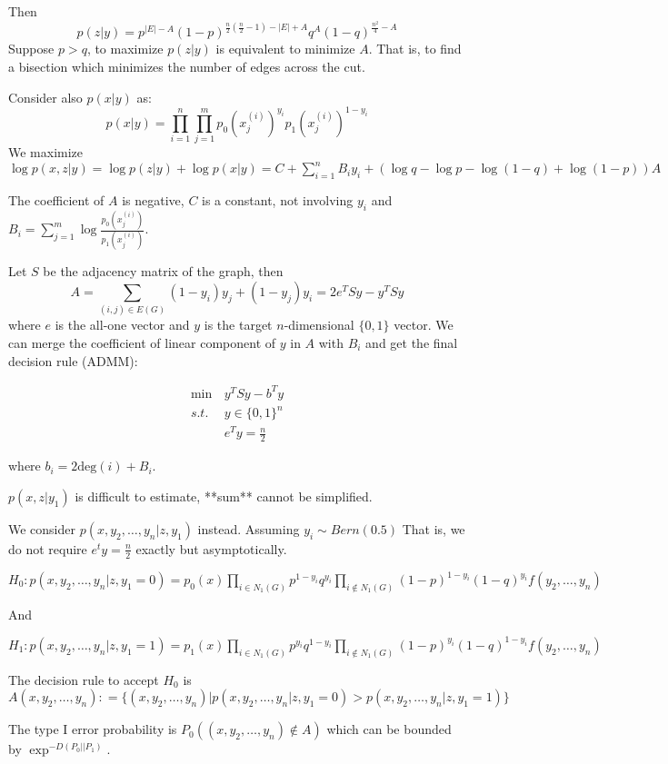 \documentclass{article}
\begin{document}
Then 
$$
p(z|y)=p^{|E|-A}(1-p)^{\frac{n}{2}(\frac{n}{2}-1)-|E|+A} q^A (1-q)^{\frac{n^2}{4}-A}
$$
Suppose $p>q$, to maximize $p(z|y)$ is equivalent to minimize $A$. That is, to find a bisection which minimizes the number of edges across the cut.

Consider also $p(x|y)$ as:
$$
p(x|y) = \prod_{i=1}^n \prod_{j=1}^m p_0(x_j^{(i)})^{y_i} p_1(x_j^{(i)})^{1-y_i}
$$
We maximize $\log p(x,z | y) = \log p(z | y) + \log p(x|y) = C + \sum_{i=1}^n B_i y_i + (\log q - \log p - \log (1-q) + \log (1-p)) A$



The coefficient of $A$ is negative, $C$ is a constant, not involving $y_i$ and $B_i  = \sum_{j=1}^m \log \frac{p_0(x_j^{(i)})}{p_1(x_j^{(i)})}$.

Let $S$ be the adjacency matrix of the graph, then
$$
A = \sum_{(i,j) \in E(G)} (1-y_i) y_j + (1-y_j) y_i = 2 e^T S y - y^T S y
$$
where $e$ is the all-one vector and $y$ is the target $n$-dimensional $\{0,1\}$ vector. We can merge the coefficient of linear component of $y$ in $A$ with $B_i$ and get the final decision rule (ADMM):

\begin{align}
\min\, & y^T S y- b^T y \\
s.t.\,\, & y \in \{0, 1\}^n \\
 &e^T y = \frac{n}{2}
\end{align}

where $b_i = 2\textrm{deg}(i) + B_i$.

$p(x, z | y_1)$  is difficult to estimate, **sum** cannot be simplified.

We consider $p(x, y_2, \dots, y_n | z, y_1)$ instead. Assuming $y_i \sim Bern(0.5)$ That is, we do not require $e^t y = \frac{n}{2}$ exactly but
asymptotically.

$H_0: p(x, y_2, \dots, y_n | z, y_1 = 0) = p_0(x) \prod_{i \in N_1(G)} p^{1-y_i} q^{y_i} \prod_{i \not \in N_1(G)} (1-p)^{1-y_i} (1-q)^{y_i} f(y_2, \dots, y_n)$

And

$H_1: p(x, y_2, \dots, y_n | z, y_1 = 1) = p_1(x) \prod_{i \in N_1(G)} p^{y_i} q^{1-y_i} \prod_{i \not \in N_1(G)} (1-p)^{y_i} (1-q)^{1-y_i} f(y_2, \dots, y_n)$

The decision rule to accept $H_0$ is $A(x, y_2, \dots, y_n) : = \{(x, y_2, \dots, y_n) | p(x, y_2, \dots, y_n | z, y_1 = 0)  > p(x, y_2, \dots, y_n | z, y_1 = 1) \}$

The type I error probability is $P_0((x, y_2, \dots, y_n) \not\in A )$ which can be bounded by $\exp^{-D(P_0 || P_1)}$.
\end{document}
